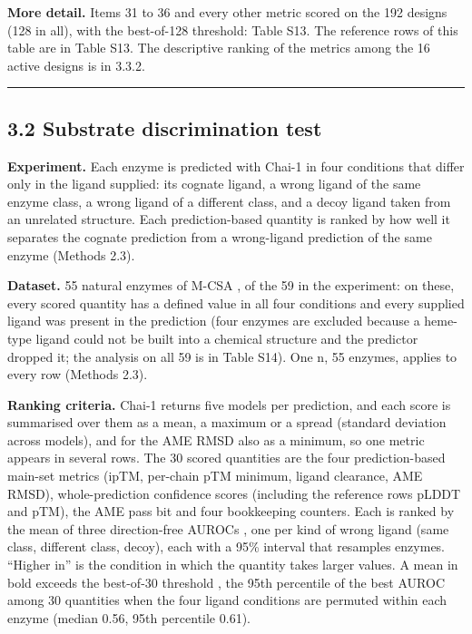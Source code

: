 \documentclass[
  10pt,
]{article}
\DeclareRobustCommand{\_}{\textunderscore\hspace{0pt}}
\begin{document}
\textbf{More
detail.} Items 31 to
36 and every other
metric scored on the
192 designs (128 in
all), with the
best-of-128
threshold: Table
S13. The reference
rows of this table
are in Table S13.
The descriptive
ranking of the
metrics among the 16
active designs is in
3.3.2.

\begin{center}\rule{0.5\linewidth}{0.5pt}\end{center}

\subsection{3.2
Substrate
discrimination test}

\textbf{Experiment.}
Each enzyme is
predicted with
Chai-1
\cite{chai2024} in
four conditions that
differ only in the
ligand supplied: its
cognate ligand, a
wrong ligand of the
same enzyme class, a
wrong ligand of a
different class, and
a decoy ligand taken
from an unrelated
structure. Each
prediction-based
quantity is ranked
by how well it
separates the
cognate prediction
from a wrong-ligand
prediction of the
same enzyme (Methods
2.3).

\textbf{Dataset.} 55
natural enzymes of
M-CSA
\cite{ribeiro2018},
of the 59 in the
experiment: on
these, every scored
quantity has a
defined value in all
four conditions and
every supplied
ligand was present
in the prediction
(four enzymes are
excluded because a
heme-type ligand
could not be built
into a chemical
structure and the
predictor dropped
it; the analysis on
all 59 is in Table
S14). One n, 55
enzymes, applies to
every row (Methods
2.3).

\textbf{Ranking
criteria.} Chai-1
returns five models
per prediction, and
each score is
summarised over them
as a mean, a maximum
or a spread
(standard deviation
across models), and
for the AME RMSD
also as a minimum,
so one metric
appears in several
rows. The 30 scored
quantities are the
four
prediction-based
main-set metrics
(ipTM, per-chain pTM
minimum, ligand
clearance, AME
RMSD),
whole-prediction
confidence scores
(including the
reference rows pLDDT
and pTM), the AME
pass bit and four
bookkeeping
counters. Each is
ranked by the mean
of three
direction-free
AUROCs
\cite{hanley1982,mann1947},
one per kind of
wrong ligand (same
class, different
class, decoy), each
with a 95\% interval
that resamples
enzymes. ``Higher
in'' is the
condition in which
the quantity takes
larger values. A
mean in bold exceeds
the best-of-30
threshold
\cite{westfall1993},
the 95th percentile
of the best AUROC
among 30 quantities
when the four ligand
conditions are
permuted within each
enzyme (median 0.56,
95th percentile
0.61).
\end{document}
